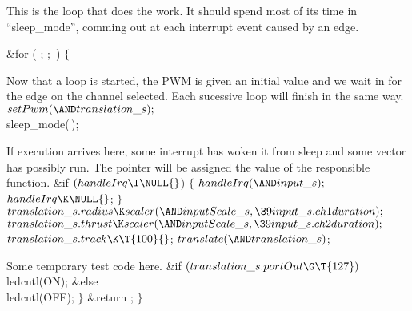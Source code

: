 This is the loop that does the work.
It should spend most of its time in ``sleep\_mode'', comming out at each
interrupt event caused by an edge.

\Y\B\&{for} ( ;  ; \,) $\{{}$\Y\par
\fi

Now that a loop is started, the PWM is given an initial value and we wait in
 for the edge on the channel selected. Each sucessive loop will
finish
in the same way.
\Y\B$\\{setPwm}({\AND}\\{translation\_s});{}$\6
\\{sleep\_mode}(\,);\par
\fi

If execution arrives here, some interrupt has woken it from sleep and some
vector has possibly run.
The pointer  will be assigned the value of the responsible
function.
\Y\B\&{if} ${}(\\{handleIrq}\I\NULL{}$)\6
${}\{{}$\1\7
${}\\{handleIrq}({\AND}\\{input\_s});{}$\6
${}\\{handleIrq}\K\NULL{}$;\6
\4${}\}{}$\2\6
${}\\{translation\_s}.\\{radius}\K\\{scaler}({\AND}\\{inputScale\_s},\39%
\\{input\_s}.\\{ch1duration});{}$\6
${}\\{translation\_s}.\\{thrust}\K\\{scaler}({\AND}\\{inputScale\_s},\39%
\\{input\_s}.\\{ch2duration});{}$\6
${}\\{translation\_s}.\\{track}\K\T{100}{}$;\6
${}\\{translate}({\AND}\\{translation\_s}){}$;\par
\fi

Some temporary test code here.
\Y\B\&{if} ${}(\\{translation\_s}.\\{portOut}\G\T{127}){}$\1\5
\\{ledcntl}(\.{ON});\2\6
\&{else}\1\5
\\{ledcntl}(\.{OFF});\2\7
$\}{}$\7
\&{return} ;\7
$\}{}$\par
\fi

